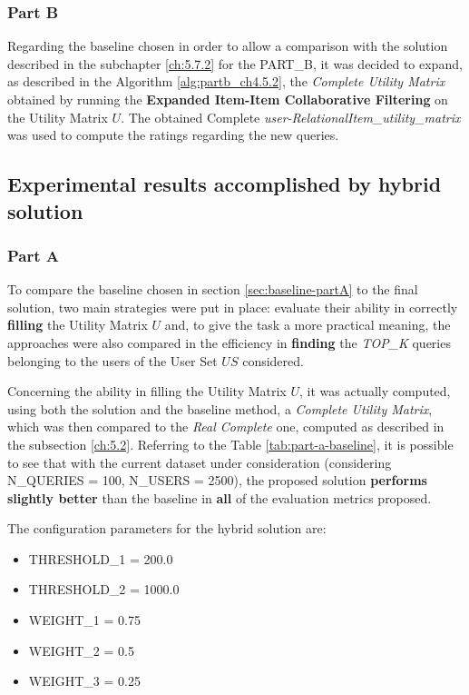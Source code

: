 \subsubsection{Part B}
Regarding the baseline chosen in order to allow a comparison with the solution described in the subchapter \ref{ch:5.7.2} for the PART\_B, it was decided to expand, as described in the Algorithm \ref{alg:partb_ch4.5.2}, the \textit{Complete Utility Matrix} obtained by running the \textbf{Expanded Item-Item Collaborative Filtering} on the Utility Matrix $U$. The obtained Complete \textit{user-RelationalItem\_utility\_matrix} was used to compute the ratings regarding the new queries.


\subsection{Experimental results accomplished by hybrid solution}
\subsubsection{Part A}
\label{sec:results-hybrid-parta}
To compare the baseline chosen in section \ref{sec:baseline-partA} to the final solution, two main strategies were put in place:  evaluate their ability in correctly \textbf{filling} the Utility Matrix $U$ and, to give the task a more practical meaning, the approaches were also compared in the efficiency in \textbf{finding} the \textit{TOP\_K} queries belonging to the users of the User Set $US$ considered.

Concerning the ability in filling the Utility Matrix $U$, it was actually computed, using both the solution and the baseline method, a \textit{Complete Utility Matrix}, which was then compared to the \textit{Real Complete} one, computed as described in the subsection \ref{ch:5.2}. Referring to the Table \ref{tab:part-a-baseline}, it is possible to see that with the current dataset under consideration (considering N\_QUERIES = 100, N\_USERS = 2500), the proposed solution \textbf{performs slightly better} than the baseline in \textbf{all} of the evaluation metrics proposed.

The configuration parameters for the hybrid solution are:
\begin{itemize}
    \item THRESHOLD\_1 = 200.0
    \item THRESHOLD\_2 = 1000.0
    \item WEIGHT\_1 = 0.75
    \item WEIGHT\_2 = 0.5
    \item WEIGHT\_3 = 0.25
\end{itemize}
    


